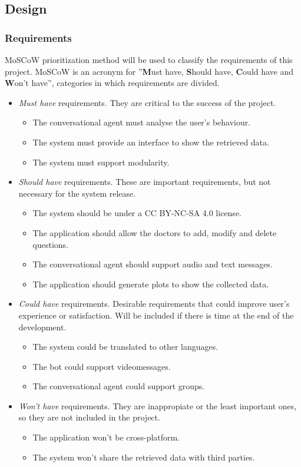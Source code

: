 \documentclass[12pt,english]{article}
\begin{document}
\subsection{Design}

\subsubsection{Requirements}
MoSCoW prioritization method \cite{moscow} will be used to classify the requirements of this project. MoSCoW is an acronym for ''\textbf{M}ust have, \textbf{S}hould have, \textbf{C}ould have and \textbf{W}on't have'', categories in which requirements are divided.
\begin{itemize}
  \item \emph{Must have} requirements. They are critical to the success of the project.
    \begin{itemize}
      \item The conversational agent must analyse the user's behaviour.
      \item The system must provide an interface to show the retrieved data.
      \item The system must support modularity.
    \end{itemize}
  \item \emph{Should have} requirements. These are important requirements, but not necessary for  the system release.
    \begin{itemize}
      \item The system should be under a CC BY-NC-SA 4.0 \cite{CC} license.
      \item The application should allow the doctors to add, modify and delete questions.
      \item The conversational agent should support audio and text messages.
      \item The application should generate plots to show the collected data.
    \end{itemize}
  \item \emph{Could have} requirements. Desirable requirements that could improve user's experience or satisfaction. Will be included if there is time at the end of the development.
    \begin{itemize}
      \item The system could be translated to other languages.
      \item The bot could support videomessages.
      \item The conversational agent could support groups.
    \end{itemize}
  \item \emph{Won't have} requirements. They are inappropiate or the least important ones, so they are not included in the project.
    \begin{itemize}
      \item The application won't be cross-platform.
      \item The system won't share the retrieved data with third parties.
    \end{itemize}
\end{itemize}
\end{document}
